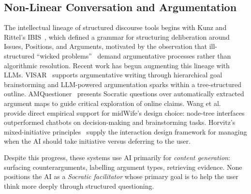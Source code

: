 \documentclass[sigconf]{acmart}
\begin{document}
\subsection{Non-Linear Conversation and Argumentation}
The intellectual lineage of structured discourse tools begins with Kunz and Rittel's
IBIS~\cite{kunz1970ibis}, which defined a grammar for structuring deliberation around
Issues, Positions, and Arguments, motivated by the observation that ill-structured
``wicked problems''~\cite{rittel1973wicked} demand argumentative processes rather than
algorithmic resolution. Recent work has begun augmenting this lineage with LLMs.
VISAR~\cite{zhang2023visar} supports argumentative writing through hierarchical goal
brainstorming and LLM-powered argumentation sparks within a tree-structured outline.
AMQuestioner~\cite{pan2025amquestioner} presents Socratic questions over automatically
extracted argument maps to guide critical exploration of online claims. Wang et
al.~\cite{wang2025nodetree} provide direct empirical support for midWife's design
choice: node-tree interfaces outperformed chatbots on decision-making and brainstorming
tasks. Horvitz's mixed-initiative principles~\cite{horvitz1999mixedinitiative} supply
the interaction design framework for managing when the AI should take initiative versus
deferring to the user.

Despite this progress, these systems use AI primarily for \textit{content generation}:
surfacing counterarguments, labelling argument types, retrieving evidence. None positions
the AI as a \textit{Socratic facilitator} whose primary goal is to help the user think
more deeply through structured questioning.
\end{document}
